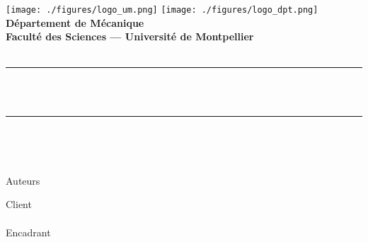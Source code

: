 
\begin{titlepage}

        \hspace*{-2.7cm}
        \vspace*{-25.7cm}

       \hspace*{1.5cm}\raggedleft
       \begin{minipage}{0.95\textwidth}
        \begin{center}
	\texttt{[image: ./figures/logo\_um.png]}\hfill
        \texttt{[image: ./figures/logo\_dpt.png]}\hfill
        ~\\[1cm]
        \textbf{\LARGE Département de Mécanique\\[0.25cm]
        Faculté des Sciences  --- Université de Montpellier}\\[1.5cm]
        \textsc{\Large }\\[0.5cm]
        \rule{\linewidth}{0.5mm} \\[0.4cm]
        {\huge \bfseries \makeatletter\@title\makeatother \\[0.4cm] }
        \rule{\linewidth}{0.5mm} \\ \begin{minipage}{\textwidth}\end{minipage} \ \\[2.5cm]
        \begin{minipage}{0.48\textwidth}
        \begin{flushleft} \large
        {\color{Gray} Auteurs}\\
        \makeatletter\@author\makeatother
        \end{flushleft}
        \end{minipage}
        \begin{minipage}{0.48\textwidth}
        \begin{flushright} \large
        {\color{Gray} Client} \\
        \client\\
        {\color{Gray} Encadrant} \\
        \encadrant
        \end{flushright}
        \end{minipage}
        

\end{center}
\end{minipage}
\end{titlepage}
